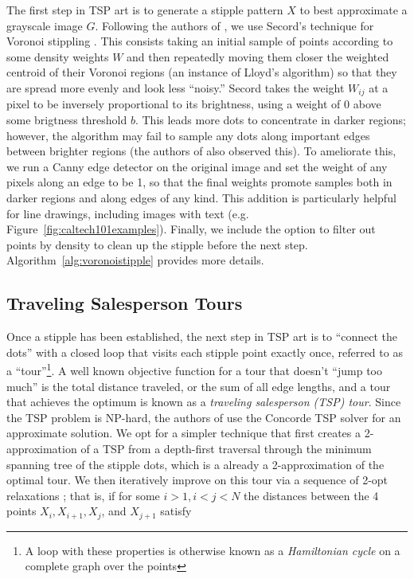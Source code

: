 \documentclass[runningheads]{llncs}
\begin{document}
The first step in TSP art is to generate a stipple pattern $X$ to best approximate a grayscale image $G$.  Following the authors of \cite{kaplan2005tsp}, we use Secord's technique for Voronoi stippling \cite{secord2002weighted}.  This consists taking an initial sample of points according to some density weights $W$ and then repeatedly moving them closer the weighted centroid of their Voronoi regions (an instance of Lloyd's algorithm) so that they are spread more evenly and look less ``noisy.''  Secord \cite{secord2002weighted} takes the weight $W_{ij}$ at a pixel to be inversely proportional to its brightness, using a weight of $0$ above some brigtness threshold $b$.  This leads more dots to concentrate in darker regions; however, the algorithm may fail to sample any dots along important edges between brighter regions (the authors of \cite{li2011structure} also observed this).   To ameliorate this, we run a Canny edge detector \cite{canny1986computational} on the original image and set the weight of any pixels along an edge to be 1, so that the final weights promote samples both in darker regions and along edges of any kind.  This addition is particularly helpful for line drawings, including images with text (e.g. Figure~\ref{fig:caltech101examples}).  Finally, we include the option to filter out points by density to clean up the stipple before the next step.  Algorithm~\ref{alg:voronoistipple} provides more details.

\subsection{Traveling Salesperson Tours}
\label{sec:tsp}
Once a stipple has been established, the next step in TSP art is to ``connect the dots'' with a closed loop that visits each stipple point exactly once, referred to as a ``tour''\footnote{A loop with these properties is otherwise known as a {\em Hamiltonian cycle} on a complete graph over the points}.  A well known objective function for a tour that doesn't ``jump too much'' is the total distance traveled, or the sum of all edge lengths, and a tour that achieves the optimum is known as a {\em traveling salesperson (TSP) tour}.  Since the TSP problem is NP-hard, the authors of  \cite{kaplan2005tsp} use the Concorde TSP solver \cite{applegate2001concorde} for an approximate solution. We opt for a simpler technique that first creates a 2-approximation of a TSP from a depth-first traversal through the minimum spanning tree of the stipple dots, which is a already a 2-approximation of the optimal tour.  We then iteratively improve on this tour via a sequence of 2-opt relaxations \cite{johnson1997traveling}; that is, if for some $i > 1, i < j < N$ the distances between the 4 points $X_i, X_{i+1}, X_j$, and $X_{j+1}$ satisfy
\end{document}
